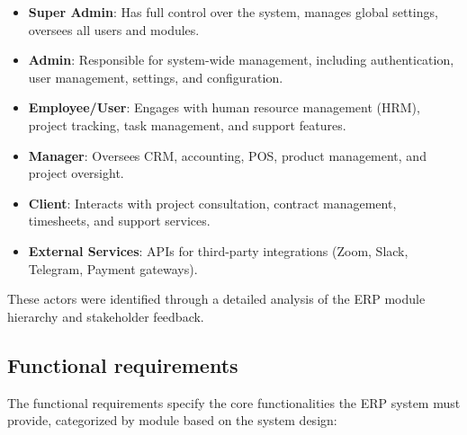 \begin{itemize}
    \item \textbf{Super Admin}: Has full control over the system, manages global settings, oversees all users and modules.
    \item \textbf{Admin}: Responsible for system-wide management, including authentication, user management, settings, and configuration.
    \item \textbf{Employee/User}: Engages with human resource management (HRM), project tracking, task management, and support features.
    \item \textbf{Manager}: Oversees CRM, accounting, POS, product management, and project oversight.
    \item \textbf{Client}: Interacts with project consultation, contract management, timesheets, and support services.
    \item \textbf{External Services}: APIs for third-party integrations (Zoom, Slack, Telegram, Payment gateways).
\end{itemize}

These actors were identified through a detailed analysis of the ERP module hierarchy and stakeholder feedback.

\subsection{Functional requirements}
The functional requirements specify the core functionalities the ERP system must provide, categorized by module based on the system design:

